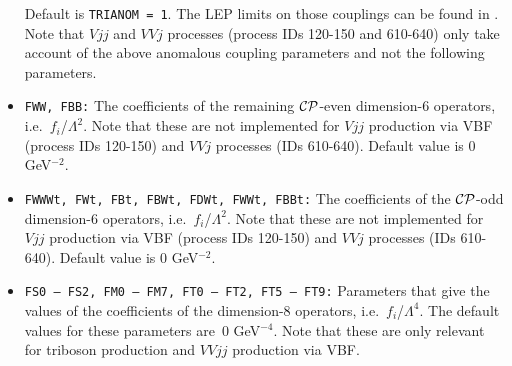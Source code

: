 \documentclass[english,12pt]{article}
\begin{document}
\begin{itemize}
  Default is {\tt TRIANOM = 1}. The LEP limits on those couplings can be found in \cite{Schael:2013ita}.
Note that $Vjj$ and $VVj$ processes (process IDs 120-150 and 610-640) only take account of the above anomalous  coupling parameters and not the following parameters.
 \item {\tt FWW, FBB:} The coefficients of the remaining $\cal{CP}$-even
dimension-6 operators, i.e.\ $f_{i}$/$\Lambda^{2}$.  Note that these are not
implemented for $Vjj$ production via VBF (process IDs 120-150) and $VVj$
processes (IDs 610-640).  Default value is 0 GeV$^{-2}$.
 \item {\tt FWWWt, FWt, FBt, FBWt, FDWt, FWWt, FBBt:} The coefficients of the
$\cal{CP}$-odd di\-mension-6 operators, i.e.\ $f_{i}$/$\Lambda^{2}$.  Note that
these are
not implemented for $Vjj$ production via VBF (process IDs 120-150) and $VVj$
processes (IDs 610-640).  Default value is 0  GeV$^{-2}$.
 \item {\tt  FS0 -- FS2, FM0 -- FM7, FT0 -- FT2, FT5 -- FT9:} Parameters that give
the values of the coefficients of the dimension-8 operators, i.e.\
$f_{i}$/$\Lambda^{4}$. The default values for these parameters are~0 GeV$^{-4}$.  Note that
these are only relevant for triboson production and $VVjj$ production via VBF.
\end{itemize}
\end{document}
